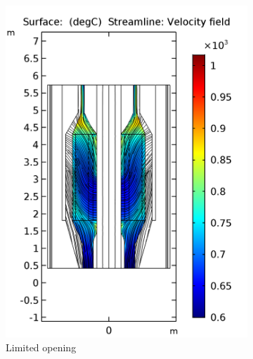 \documentclass{elsarticle}
\begin{document}
\begin{figure}
\centering
      \begin{subfigure}[b]{0.42\textwidth}
        \centering
         \includegraphics[width=\textwidth]{images/diffusion/mk1/SS/flow_opti/T_fuel_init.png}
        \caption{Limited opening}
    \end{subfigure}%
    ~ 
    \begin{subfigure}[b]{0.42\textwidth}
        \centering

\end{subfigure}
\end{figure}
\end{document}
